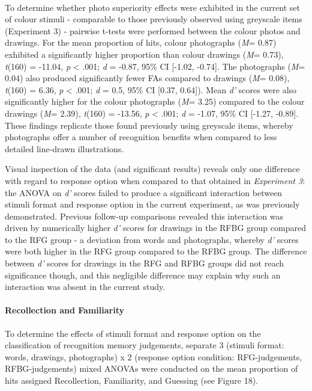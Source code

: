 \documentclass[
  11pt,
]{article}
\begin{document}
~ ~

To determine whether photo superiority effects were exhibited in the
current set of colour stimuli - comparable to those previously observed
using greyscale items (Experiment 3) - pairwise t-tests were performed
between the colour photos and drawings. For the mean proportion of hits,
colour photographs (\emph{M}= 0.87) exhibited a significantly higher
proportion than colour drawings (\emph{M}= 0.73), \emph{t}(160) =
-11.04, \emph{p} \textless{} .001; \emph{d} = -0.87, 95\% CI {[}-1.02,
-0.74{]}. The photographs (\emph{M}= 0.04) also produced significantly
fewer FAs compared to drawings (\emph{M}= 0.08), \emph{t}(160) = 6.36,
\emph{p} \textless{} .001; \emph{d} = 0.5, 95\% CI {[}0.37, 0.64{]}).
Mean \emph{d'} scores were also significantly higher for the colour
photographs (\emph{M}= 3.25) compared to the colour drawings (\emph{M}=
2.39), \emph{t}(160) = -13.56, \emph{p} \textless{} .001; \emph{d} =
-1.07, 95\% CI {[}-1.27, -0.89{]}. These findings replicate those found
previously using greyscale items, whereby photographs offer a number of
recognition benefits when compared to less detailed line-drawn
illustrations.

Visual inspection of the data (and significant results) reveals only one
difference with regard to response option when compared to that obtained
in \emph{Experiment 3}: the ANOVA on \emph{d'} scores failed to produce
a significant interaction between stimuli format and response option in
the current experiment, as was previously demonstrated. Previous
follow-up comparisons revealed this interaction was driven by
numerically higher \emph{d'} scores for drawings in the RFBG group
compared to the RFG group - a deviation from words and photographs,
whereby \emph{d'} scores were both higher in the RFG group compared to
the RFBG group. The difference between \emph{d'} scores for drawings in
the RFG and RFBG groups did not reach significance though, and this
negligible difference may explain why such an interaction was absent in
the current study.

\hypertarget{recollection-and-familiarity-1}{%
\paragraph{Recollection and
Familiarity}\label{recollection-and-familiarity-1}}

\hfill\break To determine the effects of stimuli format and response
option on the classification of recognition memory judgements, separate
3 (stimuli format: words, drawings, photographs) x 2 (response option
condition: RFG-judgements, RFBG-judgements) mixed ANOVAs were conducted
on the mean proportion of hits assigned Recollection, Familiarity, and
Guessing (see Figure 18).
\end{document}
